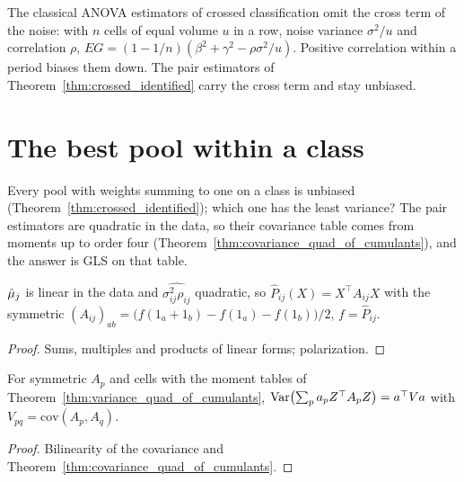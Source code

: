 \begin{remark}[Finding 42]\label{rem:finding42}
  The classical ANOVA estimators of crossed classification omit the cross term of the noise: with
  $n$ cells of equal volume $u$ in a row, noise variance $\sigma^2/u$ and correlation $\rho$,
  $E G = (1 - 1/n)(\beta^2 + \gamma^2 - \rho\sigma^2/u)$. Positive correlation within a period
  biases them down. The pair estimators of Theorem~\ref{thm:crossed_identified} carry the cross
  term and stay unbiased.
\end{remark}

\section{The best pool within a class}\label{sec:crossed_pool_weights}
Every pool with weights summing to one on a class is unbiased
(Theorem~\ref{thm:crossed_identified}); which one has the least variance? The pair estimators
are quadratic in the data, so their covariance table comes from moments up to order four
(Theorem~\ref{thm:covariance_quad_of_cumulants}), and the answer is GLS on that table.

\begin{lemma}\label{lem:pool_quadForm}
  \leanok
  $\hat\mu_j$ is linear in the data and $\widehat{\sigma^2_{ij}\rho_{ij}}$ quadratic, so
  $\widehat P_{ij}(X) = X^\top A_{ij}X$ with the symmetric
  $(A_{ij})_{ab} = \bigl(f(1_a + 1_b) - f(1_a) - f(1_b)\bigr)/2$, $f = \widehat P_{ij}$.
\end{lemma}
\begin{proof}
  \leanok
  Sums, multiples and products of linear forms; polarization.
\end{proof}

\begin{theorem}\label{thm:variance_sum_quad}
  \leanok
  For symmetric $A_p$ and cells with the moment tables of
  Theorem~\ref{thm:variance_quad_of_cumulants}, $\operatorname{Var}\bigl(\sum_p a_p Z^\top A_pZ\bigr) = a^\top Va$
  with $V_{pq} = \mathrm{cov}(A_p, A_q)$.
\end{theorem}
\begin{proof}
  \leanok
  Bilinearity of the covariance and Theorem~\ref{thm:covariance_quad_of_cumulants}.
\end{proof}

